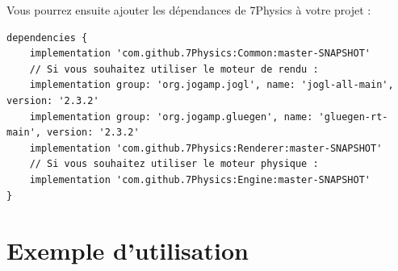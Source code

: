 \documentclass[11pt]{report}
\begin{document}
Vous pourrez ensuite ajouter les dépendances de 7Physics à votre projet :

\begin{verbatim}
dependencies {
    implementation 'com.github.7Physics:Common:master-SNAPSHOT'
    // Si vous souhaitez utiliser le moteur de rendu :
    implementation group: 'org.jogamp.jogl', name: 'jogl-all-main', version: '2.3.2'
    implementation group: 'org.jogamp.gluegen', name: 'gluegen-rt-main', version: '2.3.2'
    implementation 'com.github.7Physics:Renderer:master-SNAPSHOT'
    // Si vous souhaitez utiliser le moteur physique :
    implementation 'com.github.7Physics:Engine:master-SNAPSHOT'
}
\end{verbatim}

\newpage
\section{Exemple d'utilisation}
\end{document}
